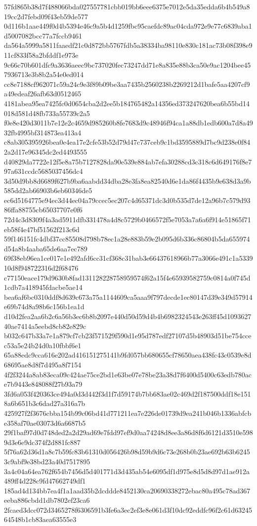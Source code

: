 {57fd865b38d7f488066bda027557781cbb019bb6eee6375e7012e5da35edda6b4b549a819cc2d7febd09f43eb59de577
0d116b1aae449f0d4b5394e46c9a5b4d1259fbc95caefdc89ac04cda972e9e77c6839aba1d5007082bcc77a7fccb9461
da564a5999a5811faaedf21c0d872bb5767fdb5a38334ba98110e830c181ac73b08f398e911cf833f58a2bfddf1e973e
9c66c70b601dfc9a3636aeec9bc737020fec73247dd71e8a835e88b3ca50e9ac1204bee457936713e3b8b2a54e0ed014
cc8e7188cf962071c59a24c9e3f89b09be3aa7435b2560238b2269212d1bafe5aa4207cf9a49edeaf26afb63d0512465
4181abea95ea7425fc0d0654cba2d2ee5b184765482a14356ed373247620bea6b55bd14018d581d48fb733a55739c2a5
f0e8e420d3011b7e12e2c4659d985260b8fe7683d9c48946f94ca1a88db1edb600a7d8a4932fb4995bf314873ea413a4
c8ab305395926bea0e4ea17e2cfe53b52d79d47c737ceb9c1bd3595889d7bc9d238e0f842a2d17e96345dc2ed4493555
d40829da7722e12f5e8a75b7127828da90e539e884ab7efa30288cd3c318c6d649176f8e797a631ccdc5685037456dc4
3d50d9bb8d6689f627b9ba6aabdd34dba28e3fa8ea82540d6e1da86f4435b9e638d3a9b585dd2ab66903b6eb60346de5
ec6d5164775e94ec3d44ec04a79ccec5ec207c4d65371dc3d0b535d7de12a96b7c579d9386ffa88755cb65037707e0f6
72d4c3d8309f4a3ad5911dfb331478a4d8c5729b0466572f5e7053a7a6a6f914e51865f71eb58f4e47bf51562f213c6d
59f146151fc4dbf37cc85508d798b78ec1a28e883b59e2b095d6b336c86804b5da655974d54a8b4aaba65de6aa7ec789
69f38eb96ea1ce017e1e492afd6cc31cf368c31bab3e66437618966b77a3066e491c1a533910d8f948722316d2f68476
c77150eace179d9630b8fad131128228758959574f62a15f4e65939582759c0814a0f745d1cdb7a418945fdacbe5ae14
bea6af6bc0310ddf8d639c673a75a1144609ca5aaa9f797decde1ec80147d39e349d57914e69b74d8a98b6c156b1ea1d
d10d2fea2aa6b2c6a56b3ec6b8b2097e440d50d59d4b4b6982324543e263ff45d109362740ae7414a5eebd8cb82e829c
b032c647b33a7e1a879cf7cb23f571529f590d1e95d787edf27107d5b48903d51be754ccec53a5e24b24d0a10fbbf6e1
65a88edc9cca616e202ad416151275141b9fd057bb680655cf78650aea438fc43c0539e8d68695ae8d8f7d495a8f7154
4f2f3244a8ab83eca09c424ae75ce2bd1e63be07e78be23a38d7f6400d5400c63edb780ace7b9443e848088f27b93a79
3fd6a053f420363ce494a0d3d442f3d1f7d59174b7bb683ae02c469d2f187500ddf18e1518a6b651b3c6dad27a316a7b
425927f2f3676cbba154b99c06bd41d771211ea7e226de01739d9ea241b046b1336abfcbe358af70ae03073d6a6687b5
29f1baf97d0d748ded2a2d29ad69e7fdd97ef9d0aa74248d8ee3a86d8f6d6121d3510e5989d3e6e9dc374f2d881fc887
5f76a62d36d1a8c7b59fc83b61310d056426b98d59b9d6c73e268b0b23ae692b63b62453c9abf9e38bd23a40d7517895
3a4c04a64ea762f654b7456d5d401771d3d435ab54e6095df1d975e8d5d8d97d1ae912a489ff4d228c9fd47662749df1
185ad4d134bb7ea4f1a1aad35b2dcddde8452130ca20690338272ebac80a495c78ad367eeba886cbdd1db7802ef23ca6
2fcaed3dcc072d3465278f6306591b3fe6a3ec2ef3e8e061d3f10dc92eddfc96f2c61d6324564548b1cb83aea63555e3
}
